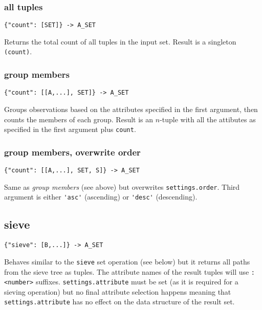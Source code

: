 \documentclass[a4paper]{article}
\begin{document}
\subsubsection{all tuples}

\begin{verbatim}
{"count": [SET]} -> A_SET
\end{verbatim}

Returns the total count of all tuples in the input set. Result is a
singleton \verb|(count)|.

\subsubsection{group members}

\begin{verbatim}
{"count": [[A,...], SET]} -> A_SET
\end{verbatim}

Groups observations based on the attributes specified in the first
argument, then counts the members of each group.  Result is an
$n$-tuple with all the attibutes as specified in the first argument
plus \verb|count|.

\subsubsection{group members, overwrite order}

\begin{verbatim}
{"count": [[A,...], SET, S]} -> A_SET
\end{verbatim}

Same as \textit{group members} (see above) but overwrites \verb|settings.order|. Third argument is either \verb|'asc'| (ascending)
or \verb|'desc'| (descending).

\subsection{sieve}

\begin{verbatim}
{"sieve": [B,...]} -> A_SET
\end{verbatim}

Behaves similar to the \verb|sieve| set operation (see below) but it returns all paths from the sieve tree as tuples.
The attribute names of the result tuples will use \verb|:<number>| suffixes. \verb|settings.attribute| must be set (as it is required for a sieving operation)
but no final attribute selection happens meaning that \verb|settings.attribute| has no effect on the data structure of the result set. 
\end{document}
